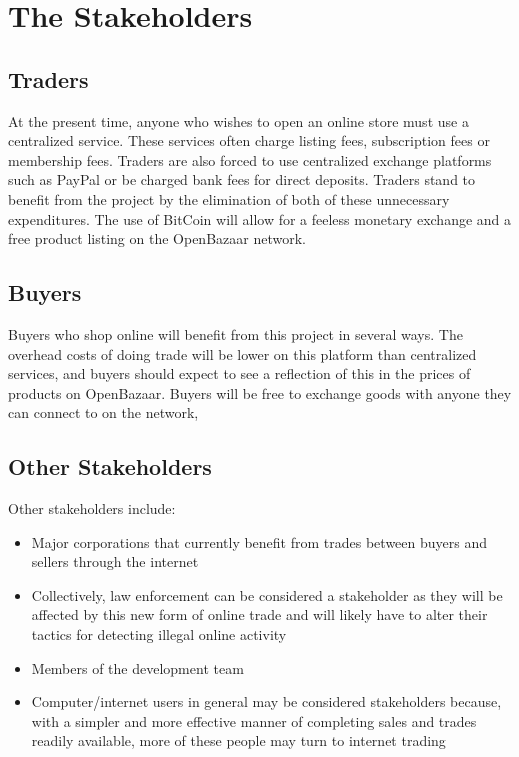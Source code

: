 \documentclass{article}
\begin{document}
\section{The Stakeholders}

\subsection{Traders}
At the present time, anyone who wishes to open an online store must use a centralized service. These services often charge listing fees, subscription fees or membership fees. Traders are also forced to use centralized exchange platforms such as PayPal or be charged bank fees for direct deposits. Traders stand to benefit from the project by the elimination of both of these unnecessary expenditures. The use of BitCoin will allow for a feeless monetary exchange and a free product listing on the OpenBazaar network.

\subsection{Buyers}
Buyers who shop online will benefit from this project in several ways. The overhead costs of doing trade will be lower on this platform than centralized services, and buyers should expect to see a reflection of this in the prices of products on OpenBazaar. Buyers will be free to exchange goods with anyone they can connect to on the network, 

\subsection{Other Stakeholders}
Other stakeholders include:

\begin{itemize}
\item
Major corporations that currently benefit from trades between buyers and sellers through the internet

\item
Collectively, law enforcement can be considered a stakeholder as they will be affected by this new form of online trade and will likely have to alter their tactics for detecting illegal online activity

\item
Members of the development team

\item
Computer/internet users in general may be considered stakeholders because, with a simpler and more effective manner of completing sales and trades readily available, more of these people may turn to internet trading
\end{itemize}
\end{document}
